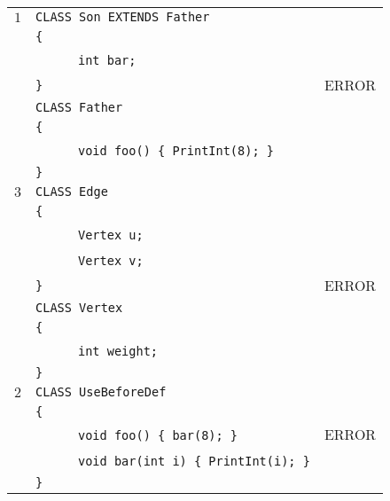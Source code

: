 \documentclass{article}
\begin{document}
\begin{table}[h]
\centering
\begin{tabular}{|l|l|l|}
\hline
 $1$ & \verb"CLASS Son EXTENDS Father"           &       \\
     & \verb"{"                                  &       \\
     & ~ ~ ~ ~\verb"int bar;"                    &       \\
     & \verb"}"                                  & ERROR \\
     & \verb"CLASS Father"                       &       \\
     & \verb"{"                                  &       \\
     & ~ ~ ~ ~\verb"void foo() { PrintInt(8); }" &       \\
     & \verb"}"                                  &       \\
\hline
 $3$ & \verb"CLASS Edge"                         &       \\
     & \verb"{"                                  &       \\
     & ~ ~ ~ ~\verb"Vertex u;"                   &       \\
     & ~ ~ ~ ~\verb"Vertex v;"                   &       \\
     & \verb"}"                                  & ERROR \\
     & \verb"CLASS Vertex"                       &       \\
     & \verb"{"                                  &       \\
     & ~ ~ ~ ~\verb"int weight;"                 &       \\
     & \verb"}"                                  &       \\
\hline
 $2$ & \verb"CLASS UseBeforeDef"                      &       \\
     & \verb"{"                                       &       \\
     & ~ ~ ~ ~\verb"void foo() { bar(8); }"           & ERROR \\
     & ~ ~ ~ ~\verb"void bar(int i) { PrintInt(i); }" &       \\
     & \verb"}"                                       &       \\

\end{tabular}
\end{table}
\end{document}

